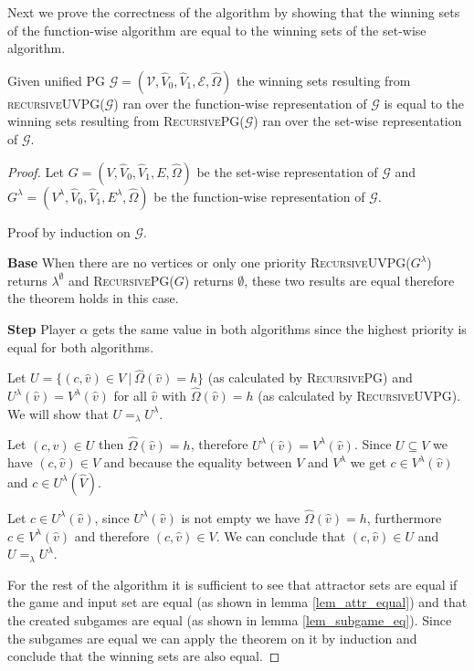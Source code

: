 Next we prove the correctness of the algorithm by showing that the winning sets of the function-wise algorithm are equal to the winning sets of the set-wise algorithm.
\begin{theorem}
	Given unified PG $\mathcal{G} = (\mathcal{V},\hat{V}_0,\hat{V}_1, \mathcal{E}, \hat{\Omega})$ the winning sets resulting from \textsc{recursiveUVPG($\mathcal{G}$)} ran over the function-wise representation of $\mathcal{G}$ is equal to the winning sets resulting from \textsc{RecursivePG($\mathcal{G}$)} ran over the set-wise representation of $\mathcal{G}$.
	\begin{proof}
		Let $G = (V,\hat{V}_0,\hat{V}_1,E,\hat{\Omega})$ be the set-wise representation of $\mathcal{G}$ and $G^\lambda = (V^\lambda, \hat{V}_0, \hat{V}_1, E^\lambda, \hat{\Omega})$ be the function-wise representation of $\mathcal{G}$.
		
		Proof by induction on $\mathcal{G}$.
		
		\textbf{Base} When there are no vertices or only one priority \textsc{RecursiveUVPG($G^\lambda$)} returns $\lambda^\emptyset$ and \textsc{RecursivePG($G$)} returns $\emptyset$, these two results are equal therefore the theorem holds in this case.
		
		\textbf{Step}
		Player $\alpha$ gets the same value in both algorithms since the highest priority is equal for both algorithms.
		
		Let $U = \{(c,\hat{v}) \in V\ |\ \hat{\Omega}(\hat{v}) = h \}$ (as calculated by \textsc{RecursivePG}) and $U^\lambda(\hat{v}) = V^\lambda(\hat{v})$ for all $\hat{v}$ with $\hat{\Omega}(\hat{v}) = h$ (as calculated by \textsc{RecursiveUVPG}). We will show that $U =_\lambda U^\lambda$.
		
		Let $(c,\hat{v}) \in U$ then $\hat{\Omega}(\hat{v}) = h$, therefore $U^\lambda(\hat{v}) = V^\lambda(\hat{v})$. Since $U \subseteq V$ we have $(c,\hat{v}) \in V$ and because the equality between $V$ and $V^\lambda$ we get $c \in V^\lambda(\hat{v})$ and $c \in U^\lambda(\hat{V})$.
		
		Let $c \in U^\lambda(\hat{v})$, since $U^\lambda(\hat{v})$ is not empty we have $\hat{\Omega}(\hat{v}) = h$, furthermore $c \in V^\lambda(\hat{v})$ and therefore $(c,\hat{v}) \in V$. We can conclude that $(c, \hat{v}) \in U$ and $U =_\lambda U^\lambda$.
		
		For the rest of the algorithm it is sufficient to see that attractor sets are equal if the game and input set are equal (as shown in lemma \ref{lem_attr_equal}) and that the created subgames are equal (as shown in lemma \ref{lem_subgame_eq}). Since the subgames are equal we can apply the theorem on it by induction and conclude that the winning sets are also equal.
	\end{proof}
\end{theorem}


